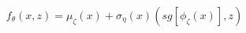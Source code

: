 \documentclass[preview]{standalone}
\begin{document}
\begin{align*}
f_\theta (x,z) =  \mu_{\zeta}(x) + \sigma_{\eta}(x) (sg[\phi_\zeta (x)],z)
\end{align*}
\end{document}
